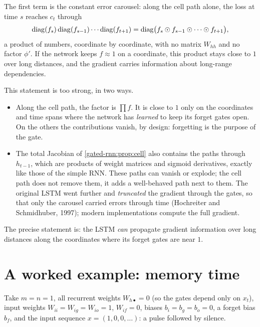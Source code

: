 \begin{notechapter}
The first term is the constant error carousel: along the cell path alone, the loss at
time $s$ reaches $c_t$ through
\[
  \operatorname{diag}(f_s)\operatorname{diag}(f_{s-1})\cdots\operatorname{diag}(f_{t+1}) = \operatorname{diag}\bigl(f_s\odot f_{s-1}\odot\cdots\odot f_{t+1}\bigr),
\]
a product of numbers, coordinate by coordinate, with no matrix $W_{hh}$ and no factor $\phi'$. If the
network keeps $f\approx1$ on a coordinate, this product stays close to $1$ over long distances, and
the gradient carries information about long-range dependencies.

\begin{pitfall}
This statement is too strong, in two ways.
\begin{itemize}[nosep]
  \item Along the cell path, the factor is $\prod f$. It is close to $1$ only on the coordinates and
        time spans where the network has \emph{learned} to keep its forget gates open. On the
        others the contributions vanish, by design: forgetting is the purpose of the gate.
  \item The total Jacobian of \cref{gated-rnn:prop:cell} also contains the paths through $h_{t-1}$, which
        are products of weight matrices and sigmoid derivatives, exactly like those of the
        simple RNN. These paths can vanish or explode; the cell path does not remove them,
        it adds a well-behaved path next to them. The original LSTM went further and
        \emph{truncated} the gradient through the gates, so that only the carousel carried
        errors through time (Hochreiter and Schmidhuber, 1997); modern implementations compute the
        full gradient.
\end{itemize}
The precise statement is: the LSTM \emph{can} propagate gradient information over long
distances along the coordinates where its forget gates are near $1$.
\end{pitfall}

\section{A worked example: memory time}\label{gated-rnn:sec:example}

\begin{example}\label{gated-rnn:ex:memory}
Take $m = n = 1$, all recurrent weights $W_{h\bullet} = 0$ (so the gates depend only on $x_t$), input weights
$W_{ii} = W_{ig} = W_{io} = 1$, $W_{if} = 0$, biases $b_i = b_g = b_o = 0$, a forget bias $b_f$, and the input sequence
$x = (1, 0, 0, \dots)$: a pulse followed by silence.


\end{example}
\end{notechapter}
